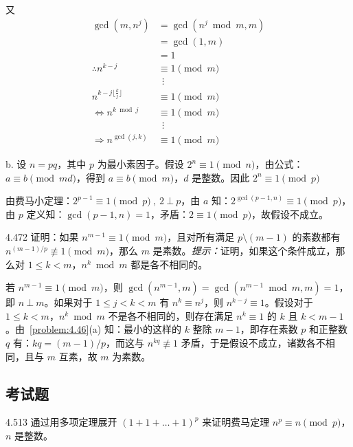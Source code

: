 又
\begin{align*}
  \gcd{(m, n^j)} &= \gcd{(n^j \bmod m, m)} \\
  &= \gcd{(1, m)} \\
  &= 1 \\
  \therefore n^{k-j} &\equiv 1 \pmod{m} \\
  & \ \ \vdots \\
  n^{k - j \lfloor \frac{k}{j} \rfloor} &\equiv 1 \pmod{m} \\
  \Leftrightarrow n^{k \bmod j} &\equiv 1 \pmod{m} \\
  & \ \ \vdots \\
  \Rightarrow n^{\gcd{(j, k)}} &\equiv 1 \pmod{m}
\end{align*}

b. 设 \( n = pq \)，其中 \( p \) 为最小素因子。假设 \( 2^n \equiv 1 \pmod{n} \)，由公式：\( a \equiv b \pmod{md} \)，得到 \( a \equiv b \pmod{m} \)，\( d \) 是整数。因此 \( 2^n \equiv 1 \pmod{p} \)

由费马小定理：\( 2^{p-1} \equiv 1 \pmod{p} \ , \ 2 \ \bot \ p \)，由 \( a \) 知：\( 2^{\gcd{(p-1, n)}} \equiv 1 \pmod{p} \)，由 \( p \) 定义知：\( \gcd{(p-1, n)} = 1 \)，矛盾：\( 2 \equiv 1 \pmod{p} \)，故假设不成立。

\begin{problem}{4.47}{2}
  证明：如果 \( n^{m-1} \equiv 1 \pmod{m} \)，且对所有满足 \( p \setminus (m-1) \) 的素数都有 \( n^{(m-1) / p} \not\equiv 1 \pmod{m} \)，那么 \( m \) 是素数。\textit{提示：}证明，如果这个条件成立，那么对 \( 1 \leqslant k < m \)，\( n^k \bmod m \) 都是各不相同的。
\end{problem}

若 \( n^{m-1} \equiv 1 \pmod{m} \)，则 \( \gcd{(n^{m-1}, m)} = \gcd{(n^{m-1} \bmod m, m)} = 1 \)，即 \( n \ \bot \ m \)。如果对于 \( 1 \leq j < k < m \) 有 \( n^k \equiv n^j \)，则 \( n^{k-j} \equiv 1 \)。假设对于 \( 1 \leqslant k < m \)，\(n^k \bmod m \) 不是各不相同的，则存在满足 \( n^k \equiv 1 \) 的 \( k \) 且 \( k < m-1 \)。由~\ref{problem:4.46}(a) 知：最小的这样的 \( k \) 整除 \( m-1 \)，即存在素数 \( p \) 和正整数 \( q \) 有：\( kq = (m-1) / p \)，而这与 \( n^{kq} \not\equiv 1 \) 矛盾，于是假设不成立，诸数各不相同，且与 \( m \) 互素，故 \( m \) 为素数。

\subsection{考试题}

\begin{problem}{4.51}{3}
  通过用多项定理展开 \( (1+1+\dots+1)^p \) 来证明费马定理 \( n^p \equiv n \pmod{p} \)，\( n \) 是整数。
\end{problem}


